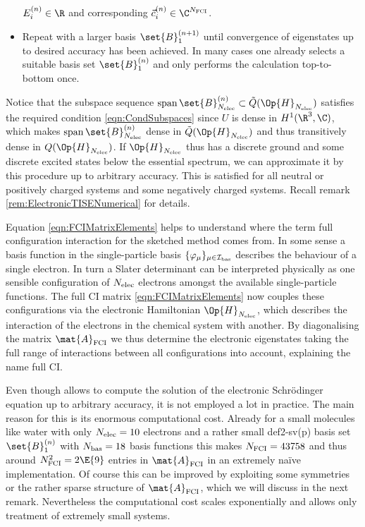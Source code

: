 \begin{rem}[Full CI]
\begin{itemize}
		$E_i^{(n)} \in \R$ and corresponding 
		$\vec{c}^{(n)}_i \in \C^{\Nfci}$.
	\item Repeat with a larger basis $\set{B}_1^{(n+1)}$ until convergence
		of eigenstates up to desired accuracy has been achieved.
		In many cases one already selects a suitable basis set
		$\set{B}_1^{(n)}$ and only performs the calculation top-to-bottom once.
	\end{itemize}
	Notice that the subspace sequence
	$\spacespan \set{B}_{\Nelec}^{(n)} \subset \tilde{Q}(\Op{H}_{\Nelec})$
	satisfies the required condition \eqref{eqn:CondSubspaces}
	since $U$ is dense in $H^1(\R^3, \C)$,
	which makes $\spacespan \set{B}_{\Nelec}^{(n)}$
	dense in $\tilde{Q}(\Op{H}_{\Nelec})$
	and thus transitively dense in $Q(\Op{H}_{\Nelec})$.
	If $\Op{H}_{\Nelec}$ thus has a discrete ground and some discrete
	excited states below the essential spectrum,
	we can approximate it by this procedure up to arbitrary accuracy.
	This is satisfied for all neutral or positively charged systems
	and some negatively charged systems.
	Recall remark \vref{rem:ElectronicTISENumerical} for details.
\end{rem}
Equation \eqref{eqn:FCIMatrixElements} helps to understand
where the term full configuration interaction for the sketched
method comes from.
In some sense a basis function in the single-particle
basis $\{\varphi_\mu\}_{\mu\in\mathcal{I}_\text{bas}}$
describes the behaviour of a single electron.
In turn a Slater determinant can be interpreted physically
as one sensible configuration of $N_\text{elec}$ electrons
amongst the available single-particle functions.
The full CI matrix \eqref{eqn:FCIMatrixElements}
now couples these configurations
via the electronic Hamiltonian $\Op{H}_{\Nelec}$,
which describes the interaction of the electrons in the chemical
system with another.
By diagonalising the matrix $\mat{A}_\text{FCI}$ we thus determine
the electronic eigenstates taking the full range of interactions between
all configurations into account, explaining the name full CI.

Even though \FCI allows to compute the solution of the electronic
Schrödinger equation up to arbitrary accuracy,
it is not employed a lot in practice.
The main reason for this is its enormous computational cost.
Already for a small molecules like water with only
$N_\text{elec} = 10$ electrons and a rather small def2-sv(p)\cite{Schaefer1992} basis set
$\set{B}_1^{(n)}$ with $N_\text{bas} = 18$ basis functions this makes $N_\text{FCI} = 43758$
and thus around $\Nfci^2 = 2\E{9}$ entries in $\mat{A}_\text{FCI}$
in an extremely na\"{i}ve implementation.
Of course this can be improved by exploiting some symmetries
or the rather sparse structure of $\mat{A}_\text{FCI}$,
which we will discuss in the next remark.
Nevertheless the computational cost scales exponentially
and allows only treatment of extremely small systems.

